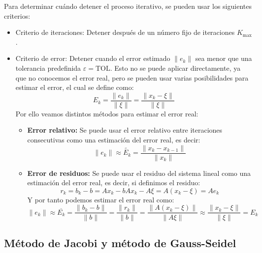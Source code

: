 \begin{proposición}
    Para determinar cuándo detener el proceso iterativo, se pueden usar los siguientes criterios:
    \begin{itemize}
        \item Criterio de iteraciones: Detener después de un número fijo de iteraciones $K_\text{max}$.
        \item Criterio de error: Detener cuando el error estimado $\| e_k \|$ sea menor que una tolerancia predefinida $\varepsilon = \text{TOL}$. Esto no se puede aplicar directamente, ya que no conocemos el error real, pero se pueden usar varias posibilidades para estimar el error, el cual se define como:
        \[
            E_k = \frac{ \| e_k \| }{ \| \xi \| } = \frac{ \| x_k - \xi \| }{ \| \xi \| }
        \]
        Por ello veamos distintos métodos para estimar el error real:
        \begin{itemize}
            \item \textbf{Error relativo:} Se puede usar el error relativo entre iteraciones consecutivas como una estimación del error real, es decir:
            \[
                \| e_k \| \approx 
                \widetilde{E_k} = 
                \frac{\| x_k - x_{k-1} \|}{ \| x_k \| }
            \]
            \item \textbf{Error de residuos:} Se puede usar el residuo del sistema lineal como una estimación del error real, es decir, si definimos el residuo:
            \[
                r_k =
                b_k - b =
                Ax_k - b
                Ax_k - A\xi =
                A(x_k - \xi) =
                Ae_k
            \]
            Y por tanto podemos estimar el error real como:
            \[
                \| e_k \| \approx
                \overline{E_k} =
                \frac{ \| b_k - b \| }{ \| b \| } =
                \frac{ \| r_k \| }{ \| b \| } =
                \frac{ \| A(x_k - \xi) \| }{ \| A\xi \| } \approx
                \frac{ \| x_k - \xi \| }{ \| \xi \| } =
                E_k
            \]
            \end{itemize}
    \end{itemize}
\end{proposición}

\subsection{Método de Jacobi y método de Gauss-Seidel}

